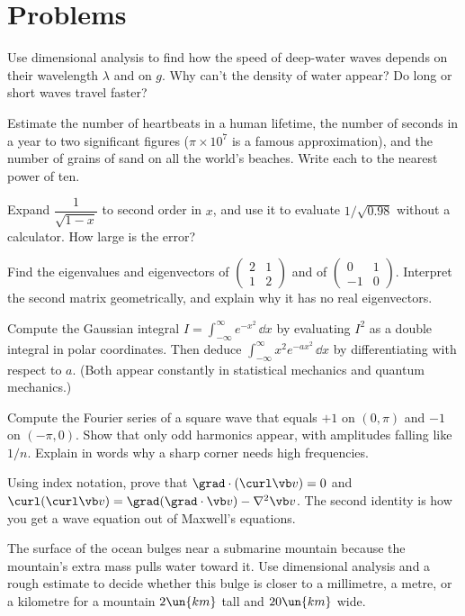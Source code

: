 \section{Problems}

\begin{problems}
\core Use dimensional analysis to find how the speed of deep-water waves depends on their wavelength $\lambda$ and on $g$. Why can't the density of water appear? Do long or short waves travel faster?

 Estimate the number of heartbeats in a human lifetime, the number of seconds in a year to two significant figures ($\pi\times10^{7}$ is a famous approximation), and the number of grains of sand on all the world's beaches. Write each to the nearest power of ten.

 Expand $\dfrac{1}{\sqrt{1-x}}$ to second order in $x$, and use it to evaluate $1/\sqrt{0.98}$ without a calculator. How large is the error?

 Find the eigenvalues and eigenvectors of $\begin{pmatrix}2&1\\1&2\end{pmatrix}$ and of $\begin{pmatrix}0&1\\-1&0\end{pmatrix}$. Interpret the second matrix geometrically, and explain why it has no real eigenvectors.

\core Compute the Gaussian integral $I = \int_{-\infty}^\infty e^{-x^2}\,\dd x$ by evaluating $I^2$ as a double integral in polar coordinates. Then deduce $\int_{-\infty}^\infty x^2 e^{-ax^2}\,\dd x$ by differentiating with respect to $a$. (Both appear constantly in statistical mechanics and quantum mechanics.)

 Compute the Fourier series of a square wave that equals $+1$ on $(0,\pi)$ and $-1$ on $(-\pi,0)$. Show that only odd harmonics appear, with amplitudes falling like $1/n$. Explain in words why a sharp corner needs high frequencies.

 Using index notation, prove that $\grad\cdot(\curl\vb v)=0$ and $\curl(\curl\vb v) = \grad(\grad\cdot\vb v) - \nabla^2\vb v$. The second identity is how you get a wave equation out of Maxwell's equations.

 The surface of the ocean bulges near a submarine mountain because the mountain's extra mass pulls water toward it. Use dimensional analysis and a rough estimate to decide whether this bulge is closer to a millimetre, a metre, or a kilometre for a mountain $2\un{km}$ tall and $20\un{km}$ wide.


\end{problems}
